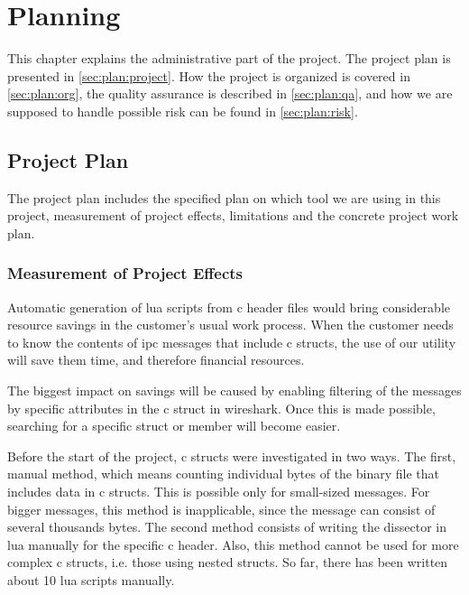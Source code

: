 \chapter{Planning}
This chapter explains the administrative part of the project. The project plan 
is presented in \autoref{sec:plan:project}. How the project is organized is 
covered in \autoref{sec:plan:org}, the quality assurance is described in 
\autoref{sec:plan:qa}, and how we are supposed to handle possible risk can be 
found in \autoref{sec:plan:risk}.

\section{Project Plan}
\label{sec:plan:project}
The project plan includes the specified plan on which tool we are using in this project, measurement of project effects, limitations and the concrete project work plan.

\subsection{Measurement of Project Effects}
Automatic generation of \Gls{lua} \glspl{script} from \Gls{c} \gls{header} files would bring considerable resource savings in the customer's usual work process.
When the customer needs to know the contents of \gls{ipc} messages that include \Gls{c} \glspl{struct}, the use of our utility will save them time, and therefore financial resources.

The biggest impact on savings will be caused by enabling filtering of the messages by specific attributes in the \Gls{c} \gls{struct} in \Gls{wireshark}. Once this is made possible, searching for a specific \gls{struct} or \gls{member} will become easier.

Before the start of the project, \Gls{c} \glspl{struct} were investigated in two ways. The first, manual method, which means counting individual bytes of the \gls{binary} file that includes data in \Gls{c} \glspl{struct}. This is possible only for small-sized messages. For bigger messages, this method is inapplicable, since the message can consist of several thousands bytes. The second method consists of writing the \gls{dissector} in \Gls{lua} manually for the specific \Gls{c} \gls{header}. Also, this method cannot be used for more complex \Gls{c} \glspl{struct}, i.e. those using \glspl{nested struct}. So far, there has been written about 10 \Gls{lua} \glspl{script} manually.

